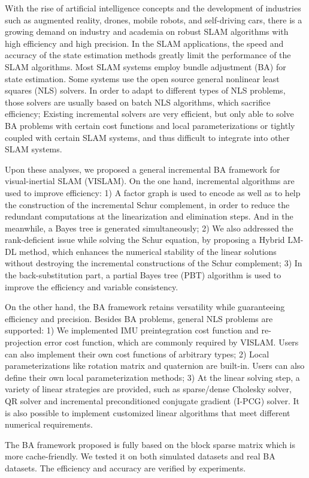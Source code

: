 \begin{englishabstract}
With the rise of artificial intelligence concepts and the development of industries such as augmented reality, drones, mobile robots, and self-driving cars, there is a growing demand on industry and academia on robust SLAM algorithms with high efficiency and high precision. In the SLAM applications, the speed and accuracy of the state estimation methods greatly limit the performance of the SLAM algorithms. Most SLAM systems employ bundle adjustment (BA) for state estimation. Some systems use the open source general nonlinear least squares (NLS) solvers. In order to adapt to different types of NLS problems, those solvers are usually based on batch NLS algorithms, which sacrifice efficiency; Existing incremental solvers are very efficient, but only able to solve BA problems with certain cost functions and local parameterizations or tightly coupled with certain SLAM systems, and thus difficult to integrate into other SLAM systems.

Upon these analyses, we proposed a general incremental BA framework for visual-inertial SLAM (VISLAM). On the one hand, incremental algorithms are used to improve efficiency: 1) A factor graph is used to encode as well as to help the construction of the incremental Schur complement, in order to reduce the redundant computations at the linearization and elimination steps. And in the meanwhile, a Bayes tree is generated simultaneously; 2) We also addressed the rank-deficient issue while solving the Schur equation, by proposing a Hybrid LM-DL method, which enhances the numerical stability of the linear solutions without destroying the incremental constructions of the Schur complement; 3) In the back-substitution part, a partial Bayes tree (PBT) algorithm is used to improve the efficiency and variable consistency.

On the other hand, the BA framework retains versatility while guaranteeing efficiency and precision. Besides BA problems, general NLS problems are supported: 1) We implemented IMU preintegration cost function and re-projection error cost function, which are commonly required by VISLAM. Users can also implement their own cost functions of arbitrary types; 2) Local parameterizations like rotation matrix and quaternion are built-in. Users can also define their own local parameterization methods; 3) At the linear solving step, a variety of linear strategies are provided, such as sparse/dense Cholesky solver, QR solver and incremental preconditioned conjugate gradient (I-PCG) solver. It is also possible to implement customized linear algorithms that meet different numerical requirements.

The BA framework proposed is fully based on the block sparse matrix which is more cache-friendly. We tested it on both simulated datasets and real BA datasets. The efficiency and accuracy are verified by experiments.

\end{englishabstract}

